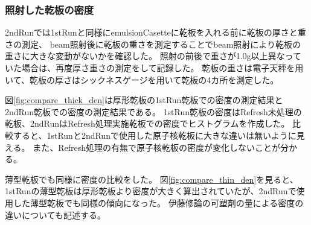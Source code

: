 \documentclass[12pt,a4paper]{jarticle}
\begin{document}
\subsubsection{照射した乾板の密度}
2ndRunでは1stRunと同様にemulsionCasetteに乾板を入れる前に乾板の厚さと重さの測定、
beam照射後に乾板の重さを測定することでbeam照射により乾板の重さに大きな変動がないかを確認した。
照射の前後で重さが1.0g以上異なっていた場合は、再度厚さ重さの測定をして記録した。
乾板の重さは電子天秤を用いて、乾板の厚さはシックネスゲージを用いて乾板の4カ所を測定した。
\par
図\ref{fig:compare_thick_den}は厚形乾板の1stRun乾板での密度の測定結果と2ndRun乾板での密度の測定結果である。
1stRun乾板の密度はRefresh未処理の乾板、2ndRunはRefresh処理実施乾板での密度でヒストグラムを作成した。
比較すると、1stRunと2ndRunで使用した原子核乾板に大きな違いは無いように見える。
また、Refresh処理の有無で原子核乾板の密度が変化しないことが分かる。
\par
薄型乾板でも同様に密度の比較をした。
図\ref{fig:compare_thin_den}を見ると、1stRunの薄型乾板は厚形乾板より密度が大きく算出されていたが、2ndRunで使用した薄型乾板でも同様の傾向になった。
伊藤修論の可塑剤の量による密度の違いについても記述する。
\par
\end{document}
